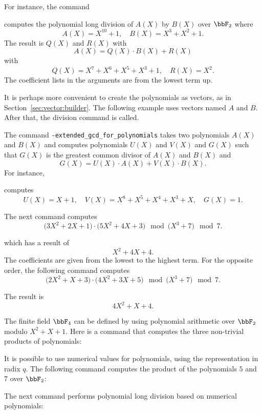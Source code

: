 For instance, the command 
{\tt

}
computes the polynomial long division of $A(X)$ by $B(X)$ over $\bbF_2$ where 
$$
A(X) = X^{10} + 1, \quad B(X) = X^3+X^2+1.
$$
The result is $Q(X)$ and $R(X)$
with 
$$
A(X) = Q(X) \cdot B(X) + R(X)
$$
with 
$$
Q(X) = X^{7} + X^{6} + X^{5} + X^{3} + 1, \quad R(X) = X^{2}.
$$
The coefficient lists in the arguments are from the lowest term up.

\bigskip


It is perhaps more convenient to create the polynomials
as vectors, as in Section~\ref{sec:vector:builder}. 
The following example uses vectors named $A$ and $B.$
After that, the division command is called. 
{\tt

}


\bigskip





The command 
\verb'-extended_gcd_for_polynomials' takes two polynomials $A(X)$ and $B(X)$ and 
computes polynomials $U(X)$ and $V(X)$ and $G(X)$ such that $G(X)$ 
is the greatest common divisor of $A(X)$ and $B(X)$ and 
$$
G(X) = U(X) \cdot A(X) + V(X) \cdot B(X).
$$
For instance, 
{\tt

}
computes 
$$
U(X)=X + 1, \quad 
V(X)=X^{8} + X^{5} + X^{4} + X^{3} + X, \quad 
G(X)=1.
$$


\bigskip

The next command computes 
$$
\big( 3X^2 + 2X + 1 \big) \cdot \big( 5X^2+4X+3\big) \mod \big( X^3 +7\big) \mod 7.
$$
{\tt

}
which has a result of 
$$
X^2+4X+4.
$$
The coefficients are given from the lowest to the highest term. 
For the opposite order, the following command computes 
$$
\big(2X^{2} + X + 3\big) \cdot  \big(4X^{2} + 3X + 5\big) \mod \big( X^3 +7\big) \mod 7.
$$
{\tt

}
The result is 
$$
4X^{2} + X + 4.
$$

\bigskip


The finite field $\bbF_4$ can be defined by using polynomial arithmetic over $\bbF_2$ 
modulo $X^2+X+1.$
Here is a command that computes the three non-trivial products of polynomials:
{\tt

}


\bigskip

It is possible to use numerical values for polynomials, using the representation in radix $q.$
The following command computes the product of the polynomials $5$ and $7$ over $\bbF_2$:
{\tt

}
The next command performs polynomial long division based on numerical polynomials:
{\tt

}

